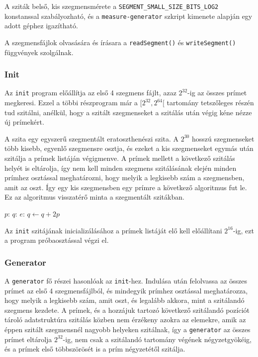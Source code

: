 A sziták belső, kis szegmensmérete a \texttt{SEGMENT\_SMALL\_SIZE\_BITS\_LOG2} konstanssal szabályozható, és a \texttt{measure-generator} szkript kimenete alapján egy adott géphez igazítható.

A szegmensfájlok olvasására és írásara a \texttt{readSegment()} és \texttt{writeSegment()} függvények szolgálnak.

\subsubsection{Init}

Az \texttt{init} program előállítja az első 4 szegmens fájlt, azaz $2^{32}$-ig az összes prímet megkeresi.
Ezzel a többi részprogram már a $[2^{32}, 2^{64}[$ tartomány tetszőleges részén tud szitálni, anélkül, hogy a szitált szegmenseket a szitálás után végig kéne nézze új prímekért.

A szita egy egyszerű szegmentált eratoszthenészi szita.
A $2^{30}$ hosszú szegmenseket több kisebb, egyenlő szegmensre osztja, és ezeket a kis szegmenseket
egymás után szitálja a prímek listáján végigmenve.
A prímek mellett a következő szitálás helyét is eltárolja, így nem kell minden szegmens szitálásának elején minden prímhez osztással meghatározni, hogy melyik a legkisebb szám a szegmensben, amit az oszt.
Így egy kis szegmensben egy prímre a következő algoritmus fut le.
Ez az algoritmus visszatérő minta a szegmentált szitákban.

\begin{algorithmic}[1]
\State $p$: 
\State $q$: 
\State $e$: 
	\State {}
	\State $q \gets q + 2p$
\EndWhile
\end{algorithmic}

Az \texttt{init} szitájának inicializálásához a prímek listáját elő kell előállítani $2^{16}$-ig, ezt a program próbaosztással végzi el.

\subsubsection{Generator}

A \texttt{generator} fő részei hasonlóak az \texttt{init}-hez.
Indulása után felolvassa az összes prímet az első 4 szegmensfájlból, és mindegyik prímhez osztással meghatározza, hogy melyik a legkisebb szám, amit oszt, és legalább akkora, mint a szitálandó szegmens kezdete.
A prímek, és a hozzájuk tartozó következő szitálandó pozíciót tároló adatstruktúra szitálás közben nem érzékeny azokra az elemekre, amik az éppen szitált szegmensnél nagyobb helyeken szitálnak, így a \texttt{generator} az összes prímet eltárolja $2^{32}$-ig, nem csak a szitálandó tartomány végének négyzetgyökéig, és a prímek első többszörösét is a prím négyzetétől szitálja.

